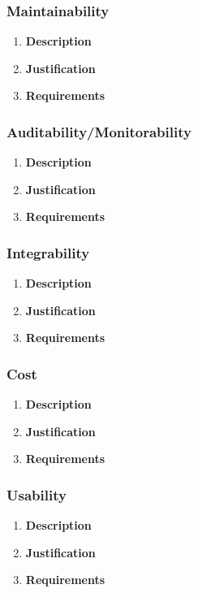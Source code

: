 \documentclass[a4paper,10pt]{article}
\begin{document}
\subsubsection{Maintainability}
\begin{enumerate}
\item \textbf{Description} \\
\item \textbf{Justification} \\
\item \textbf{Requirements}
\end{enumerate}
\subsubsection{Auditability/Monitorability}
\begin{enumerate}
\item \textbf{Description} \\
\item \textbf{Justification} \\
\item \textbf{Requirements}
\end{enumerate}
\subsubsection{Integrability}
\begin{enumerate}
\item \textbf{Description} \\
\item \textbf{Justification} \\
\item \textbf{Requirements}
\end{enumerate}
\subsubsection{Cost}
\begin{enumerate}
\item \textbf{Description} \\
\item \textbf{Justification} \\
\item \textbf{Requirements}
\end{enumerate}
\subsubsection{Usability}
\begin{enumerate}
\item \textbf{Description} \\
\item \textbf{Justification} \\
\item \textbf{Requirements}
\end{enumerate}
\end{document}
